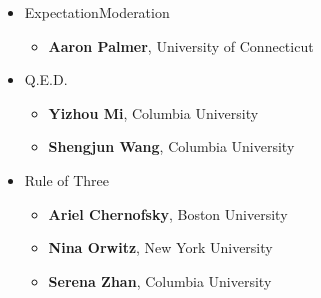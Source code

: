 
\begin{itemize}
\item ExpectationModeration
  \begin{itemize}
  \item \textbf{Aaron Palmer}, University of Connecticut
  \end{itemize}
\item Q.E.D.
  \begin{itemize}
  \item \textbf{Yizhou Mi}, Columbia University
  \item \textbf{Shengjun Wang}, Columbia University
  \end{itemize}
\item Rule of Three
  \begin{itemize}
  \item \textbf{Ariel Chernofsky}, Boston University
  \item \textbf{Nina Orwitz}, New York University
  \item \textbf{Serena Zhan}, Columbia University 
  \end{itemize}
\end{itemize}




